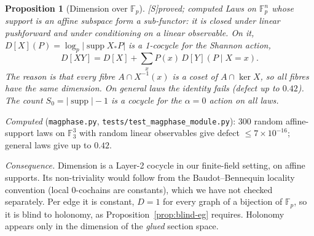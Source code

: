 \documentclass[11pt]{article}
\newtheorem{proposition}[theorem]{Proposition}
\theoremstyle{definition}
\theoremstyle{remark}
\newcommand{\F}{\mathbb{F}}
\newcommand{\src}[1]{\textsf{\small[#1]}}
\newcommand{\st}[1]{\textsf{\small\color{gray}#1}}
\begin{document}
\begin{proposition}[Dimension over $\F_p$]\label{prop:ffdim}\src{S}\st{proved; computed}
Laws on $\F_p^n$ whose support is an affine subspace form a sub-functor: it is closed under linear pushforward and under conditioning on a linear observable. On it, $D[X](P)=\log_p|\operatorname{supp}X_*P|$ is a 1-cocycle for the Shannon action,
\[
D[XY]=D[X]+\textstyle\sum_xP(x)\,D[Y](P\mid X=x).
\]
The reason is that every fibre $A\cap X^{-1}(x)$ is a coset of $A\cap\ker X$, so all fibres have the same dimension. On general laws the identity fails (defect up to $0.42$). The count $S_0=|\operatorname{supp}|-1$ is a cocycle for the $\alpha=0$ action on all laws.
\end{proposition}
\noindent\emph{Computed} (\texttt{magphase.py}, \texttt{tests/test\_magphase\_module.py}): 300 random affine-support laws on $\F_3^3$ with random linear observables give defect $\le7\times10^{-16}$; general laws give up to $0.42$.

\noindent\emph{Consequence.} Dimension is a Layer-2 cocycle in our finite-field setting, on affine supports. Its non-triviality would follow from the Baudot--Bennequin locality convention (local 0-cochains are constants), which we have not checked separately. Per edge it is constant, $D=1$ for every graph of a bijection of $\F_p$, so it is blind to holonomy, as Proposition~\ref{prop:blind-eg} requires. Holonomy appears only in the dimension of the \emph{glued} section space.
\end{document}
